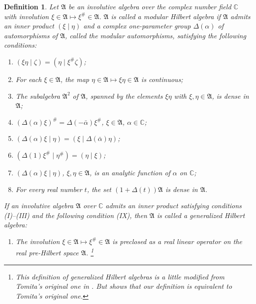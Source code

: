 \documentclass[12pt,b5paper,twoside]{article}
\theoremstyle{takesaki}
\newtheorem{definition}{Definition}[section]
\numberwithin{equation}{section}
\begin{document}
\begin{definition}\label{def:2.1}
Let $\mathfrak A$ be an involutive algebra over the complex number field
$\mathbb C$ with involution
$\xi\in\mathfrak A\longmapsto\xi^\#\in\mathfrak A$.
$\mathfrak A$ is called a \emph{modular Hilbert algebra} if $\mathfrak A$
admits an inner product $(\xi\mid\eta)$ and a complex one-parameter group
$\Delta(\alpha)$ of automorphisms of $\mathfrak A$, called the modular
automorphisms, satisfying the following conditions:
\begin{enumerate}[label=(\Roman*)]
  \item $(\xi\eta\mid\zeta)=(\eta\mid\xi^\#\zeta)$;
  \item For each $\xi\in\mathfrak A$, the map
  $\eta\in\mathfrak A\longmapsto\xi\eta\in\mathfrak A$ is continuous;

  \item The subalgebra $\mathfrak A^2$ of $\mathfrak A$, spanned by the
  elements $\xi\eta$ with $\xi,\eta\in\mathfrak A$, is dense in
  $\mathfrak A$;
  \item $(\Delta(\alpha)\xi)^\#=\Delta(-\bar\alpha)\xi^\#$,
  $\xi\in\mathfrak A$, $\alpha\in\mathbb C$;
  \item $(\Delta(\alpha)\xi\mid\eta)
  =(\xi\mid\Delta(\bar\alpha)\eta)$;
  \item $(\Delta(1)\xi^\#\mid\eta^\#)=(\eta\mid\xi)$;
  \item $(\Delta(\alpha)\xi\mid\eta)$, $\xi,\eta\in\mathfrak A$, is an
  analytic function of $\alpha$ on $\mathbb C$;
  \item For every real number $t$, the set
  $(1+\Delta(t))\mathfrak A$ is dense in $\mathfrak A$.
\end{enumerate}
If an involutive algebra $\mathfrak A$ over $\mathbb C$ admits an inner
product satisfying conditions (I)--(III) and the following condition
(IX), then $\mathfrak A$ is called a \emph{generalized Hilbert algebra}:
\begin{enumerate}[label=(IX)]
  \item The involution
  $\xi\in\mathfrak A\longmapsto\xi^\#\in\mathfrak A$ is preclosed as a
  real linear operator on the real pre-Hilbert space $\mathfrak A$.
  \footnote{This definition of generalized Hilbert algebras is a little
  modified from Tomita's original one in \cite{ref22}.  But
   shows that our definition is equivalent to Tomita's
  original one.}
\end{enumerate}
\end{definition}
\end{document}

